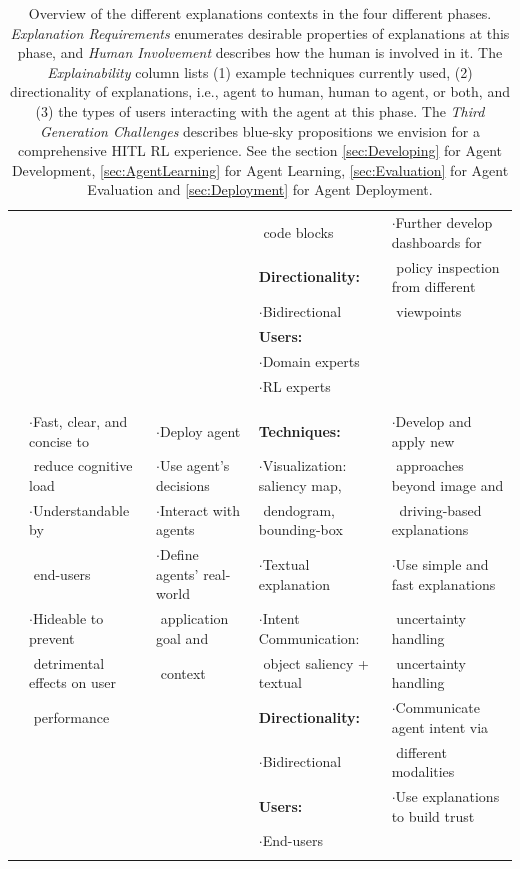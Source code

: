 \documentclass[twoside,11pt]{article}
\begin{document}
\begin{table}[!htbp]
{\begin{tabular}{|c||l|l|l|l|}
			&&& $ $ code blocks& $\cdot$Further develop dashboards for \\
			&   & 	&	 \textbf{Directionality:}	& $ $ policy inspection from different 	\\
			&   & 	&	 $\cdot$Bidirectional	& $ $ viewpoints	\\
			&    & 	&	 \textbf{Users:}	& 	\\
			&   & 	&	 $\cdot$Domain experts	&	\\
			&  $ $   & 	&	 $\cdot$RL experts	& 	\\
			&  &  & & \\
			\cline{1-5}
			\multirow{12}{*}{\rotatebox{90}{\hspace{0em}\textsc{Deployment}}}
			&  &  & & \\
			&  $\cdot$Fast, clear, and concise to& $\cdot$Deploy agent	&\textbf{Techniques:}	&	$\cdot$Develop and apply new \\
			&  $ $  reduce cognitive load& $\cdot$Use agent’s decisions	&	 $\cdot$Visualization: saliency map,	&$ $ approaches beyond image and 	\\
			&  $\cdot$Understandable by & $\cdot$Interact with agents	&	 $ $ dendogram, bounding-box	&	$\ $ driving-based explanations\\
			& $ $ end-users	 & $\cdot$Define agents' real-world 	& $\cdot$Textual explanation	 & $\cdot$Use simple and fast explanations	\\
			& $\cdot$Hideable to prevent  & $ $ application goal and	&	 $\cdot$Intent Communication:	& $ $ uncertainty handling\\
			& $ $ detrimental effects on user & $ $ context& $ $ object saliency + textual& $ $ uncertainty handling\\
			& $ $ performance & 	&	\textbf{Directionality:}	&$\cdot$Communicate agent intent via 	\\
			&   & 	&	 $\cdot$Bidirectional	& $ $ different modalities	\\
			&   & 	&\textbf{Users:}	& $\cdot$Use explanations to build trust	\\
			&   & 	&	 $\cdot$End-users	&	\\
			&  &  & & \\
			\cline{1-5}
		\end{tabular}
	}
	\caption{Overview of the different explanations contexts in the four different phases. \emph{Explanation Requirements} enumerates desirable properties of explanations at this phase, and \emph{Human Involvement} describes how the human is involved in it. The \emph{Explainability} column lists (1) example techniques currently used, (2) directionality of explanations, i.e., agent to human, human to agent, or both, and (3) the types of users interacting with the agent at this phase. The \emph{Third Generation Challenges} describes blue-sky propositions we envision for a comprehensive HITL RL experience. See the section \ref{sec:Developing} for Agent Development, \ref{sec:AgentLearning} for Agent Learning, \ref{sec:Evaluation} for Agent Evaluation and \ref{sec:Deployment} for Agent Deployment.}
	\label{table:Explanations_table}
\end{table}
\end{document}
